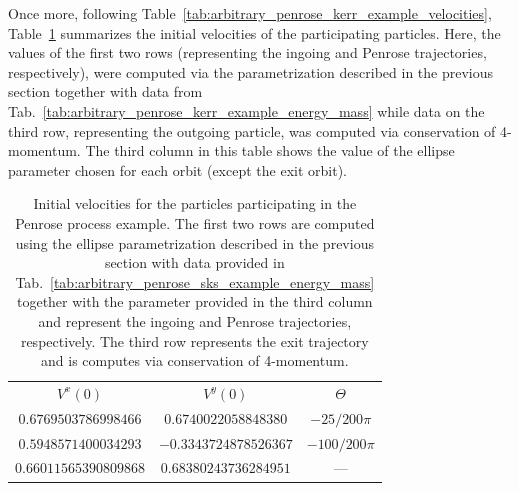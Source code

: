Once more, following Table~\ref{tab:arbitrary_penrose_kerr_example_velocities}, Table~\ref{tab:arbitrary_penrose_sks_example_velocities} summarizes the initial velocities of the participating particles. Here, the values of the first two rows (representing the ingoing and Penrose trajectories, respectively), were computed via the parametrization described in the previous section together with data from Tab.~\ref{tab:arbitrary_penrose_kerr_example_energy_mass} while data on the third row, representing the outgoing particle, was computed via conservation of 4-momentum. The third column in this table shows the value of the ellipse parameter chosen for each orbit (except the exit orbit).
%
\begin{table}[]
  \centering
  \begin{tabular}{ccc}
    \hline\hline
    $V^x(0)$              & $V^y(0)$              & $\Theta$       \\
    $0.6769503786998466$  & $0.6740022058848380$  & $-25/200 \pi$  \\
    $0.5948571400034293$  & $-0.3343724878526367$ & $-100/200 \pi$ \\
    $0.66011565390809868$ & $0.68380243736284951$ & ---            \\ \hline\hline
  \end{tabular}
  \caption{Initial velocities for the particles participating in the Penrose process example. The first two rows are computed using the ellipse parametrization described in the previous section with data provided in Tab.~\ref{tab:arbitrary_penrose_sks_example_energy_mass} together with the parameter provided in the third column and represent the ingoing and Penrose trajectories, respectively. The third row represents the exit trajectory and is computes via conservation of 4-momentum.}
  \label{tab:arbitrary_penrose_sks_example_velocities}
\end{table}


